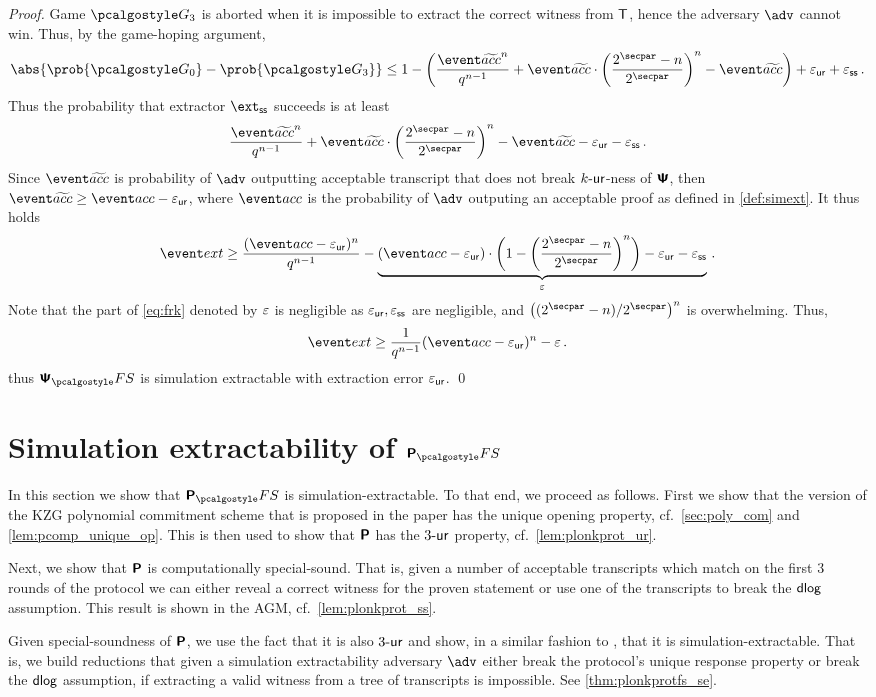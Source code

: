 \documentclass[runningheads,11pt]{llncs}
\theoremstyle{definition} \newtheorem{definition}[theorem]{Definition}
\begin{document}
\begin{proof}
Game $\game{3}$ is aborted when it is impossible to extract the correct witness
from $\mathsf{T}$, hence the adversary $\advse$ cannot win.  Thus, by the game-hoping
argument,
\[
	\abs{\prob{\game{0}} - \prob{\game{3}}} \leq 1 -
	\left(\frac{\waccProb^{n}}{q^{n - 1}} + \waccProb \cdot
	\left(\frac{2^\secpar - n}{2^\secpar}\right)^{n} - \waccProb\right) + \epsur + \epsss\,.
\]
Thus the probability that extractor $\extss$ succeeds is at least
\[
	\frac{\waccProb^{n}}{q^{n - 1}} + 
	\waccProb \cdot
	\left( \frac{2^\secpar - n}{2^\secpar}\right)^{n} -
\waccProb - \epsur - \epsss\,.
\]
Since $\waccProb$ is probability of $\advse$ outputting acceptable transcript
that does not break ${k\text{-}\mathsf{ur}}$-ness of $\bm{\mathsf{\Psi}}$, then $\waccProb \geq \accProb -
\epsur$, where $\accProb$ is the probability of $\advse$ outputing an acceptable
proof as defined in \cref{def:simext}. It thus holds
\[
	\label{eq:frk}
	\extProb \geq \frac{(\accProb - \epsur)^{n}}{q^{n - 1}} -
	\underbrace{(\accProb - \epsur) \cdot \left( 1 -
      \left(\frac{2^\secpar - n}{2^\secpar}\right)^{n}\right)
- \epsur - \epsss}_{\eps}\,.
\]
Note that the part of \cref{eq:frk} denoted by $\varepsilon$ is negligible as
$\varepsilon_{\mathsf{ur}}, \varepsilon_{\mathsf{ss}}$ are negligible, and $\left(\infrac{(2^\secpar
- n)}{2^\secpar}\right)^{n}$ is overwhelming.
Thus, 
\[
	\extProb \geq \frac{1}{q^{n - 1}} (\accProb - \epsur)^{n} -\eps\,.
\] 
thus
$\psfs$ is simulation extractable with extraction error $\varepsilon_{\mathsf{ur}}$.
\qed
\end{proof}

\section{Simulation extractability of $\plonkprotfs$} 
In this section we show that $\plonkprotfs$ is simulation-extractable. To that
end, we proceed as follows. First we show that the version of the KZG polynomial
commitment scheme that is proposed in the \plonk{} paper has the unique opening
property, cf.~\cref{sec:poly_com} and \cref{lem:pcomp_unique_op}. This is then
used to show that $\bm{\mathsf{P}}$ has the ${3\text{-}\mathsf{ur}}$ property,
cf.~\cref{lem:plonkprot_ur}.

Next, we show that $\bm{\mathsf{P}}$ is computationally special-sound. That is, given a
number of acceptable transcripts which match on the first 3 rounds of the
protocol we can either reveal a correct witness for the proven statement or use
one of the transcripts to break the $\mathsf{dlog}$ assumption. This result is shown in
the AGM, cf.~\cref{lem:plonkprot_ss}.

Given special-soundness of $\bm{\mathsf{P}}$, we use the fact that it is also
${3\text{-}\mathsf{ur}}$ and show, in a similar fashion to \cite{INDOCRYPT:FKMV12}, that it is
simulation-extractable. That is, we build reductions that given a simulation
extractability adversary $\advse$ either break the protocol's unique response
property or break the $\mathsf{dlog}$ assumption, if extracting a valid witness from a
tree of transcripts is impossible. See \cref{thm:plonkprotfs_se}.
\end{document}
